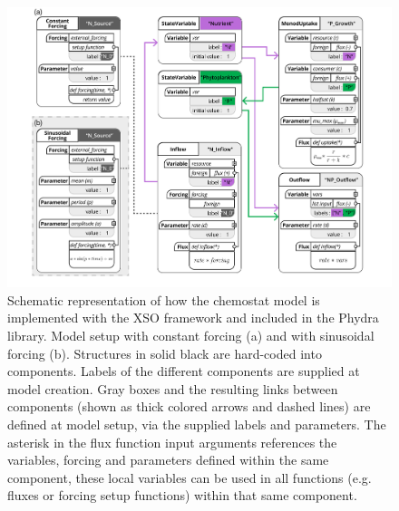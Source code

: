 \documentclass[journal abbreviation, manuscript]{copernicus}
\begin{document}
\begin{figure}[t]
\includegraphics[width=15cm]{Figures/firstdraft_schematics/code_schematics/Chemostat.pdf}
\caption{Schematic representation of how the chemostat model is implemented with the XSO framework and included in the Phydra library. Model setup with constant forcing (a) and with sinusoidal forcing (b). Structures in solid black are hard-coded into components. Labels of the different components are supplied at model creation. Gray boxes and the resulting links between components (shown as thick colored arrows and dashed lines) are defined at model setup, via the supplied labels and parameters. The asterisk in the flux function input arguments references the variables, forcing and parameters defined within the same component, these local variables can be used in all functions (e.g. fluxes or forcing setup functions) within that same component.}
\label{Figure:CodeSchematics_1}
\end{figure}
\end{document}
